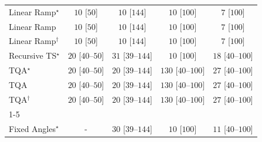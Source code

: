 \begin{tabular}{l|cccc|}
Linear Ramp$^\star$ & {\cellcolor[HTML]{F7FCF5}} \color[HTML]{000000} $10$ [$50$] & {\cellcolor[HTML]{F7FCF5}} \color[HTML]{000000} $10$ [$144$] & {\cellcolor[HTML]{F7FCF5}} \color[HTML]{000000} $10$ [$100$] & {\cellcolor[HTML]{F7FCF5}} \color[HTML]{000000} $7$ [$100$] \\
Linear Ramp & {\cellcolor[HTML]{F7FCF5}} \color[HTML]{000000} $10$ [$50$] & {\cellcolor[HTML]{F7FCF5}} \color[HTML]{000000} $10$ [$144$] & {\cellcolor[HTML]{F7FCF5}} \color[HTML]{000000} $10$ [$100$] & {\cellcolor[HTML]{F7FCF5}} \color[HTML]{000000} $7$ [$100$] \\
Linear Ramp$^\dagger$ & {\cellcolor[HTML]{F7FCF5}} \color[HTML]{000000} $10$ [$50$] & {\cellcolor[HTML]{F7FCF5}} \color[HTML]{000000} $10$ [$144$] & {\cellcolor[HTML]{F7FCF5}} \color[HTML]{000000} $10$ [$100$] & {\cellcolor[HTML]{F7FCF5}} \color[HTML]{000000} $7$ [$100$] \\
Recursive TS$^\star$ & {\cellcolor[HTML]{F5FBF2}} \color[HTML]{000000} $20$ [$40$--$50$] & {\cellcolor[HTML]{F3FAF0}} \color[HTML]{000000} $31$ [$39$--$144$] & {\cellcolor[HTML]{F7FCF5}} \color[HTML]{000000} $10$ [$100$] & {\cellcolor[HTML]{F5FBF3}} \color[HTML]{000000} $18$ [$40$--$100$] \\
TQA$^\star$ & {\cellcolor[HTML]{F5FBF2}} \color[HTML]{000000} $20$ [$40$--$50$] & {\cellcolor[HTML]{F5FBF2}} \color[HTML]{000000} $20$ [$39$--$144$] & {\cellcolor[HTML]{DDF2D8}} \color[HTML]{000000} $130$ [$40$--$100$] & {\cellcolor[HTML]{F4FBF1}} \color[HTML]{000000} $27$ [$40$--$100$] \\
TQA & {\cellcolor[HTML]{F5FBF2}} \color[HTML]{000000} $20$ [$40$--$50$] & {\cellcolor[HTML]{F5FBF2}} \color[HTML]{000000} $20$ [$39$--$144$] & {\cellcolor[HTML]{DDF2D8}} \color[HTML]{000000} $130$ [$40$--$100$] & {\cellcolor[HTML]{F4FBF1}} \color[HTML]{000000} $27$ [$40$--$100$] \\
TQA$^\dagger$ & {\cellcolor[HTML]{F5FBF2}} \color[HTML]{000000} $20$ [$40$--$50$] & {\cellcolor[HTML]{F5FBF2}} \color[HTML]{000000} $20$ [$39$--$144$] & {\cellcolor[HTML]{DDF2D8}} \color[HTML]{000000} $130$ [$40$--$100$] & {\cellcolor[HTML]{F4FBF1}} \color[HTML]{000000} $27$ [$40$--$100$] \\
\cline{1-5}
\multicolumn{5}{c}{\rule{0pt}{8pt}PP} \\
\midrule
Fixed Angles$^\star$ & {\cellcolor[HTML]{000000}} \color[HTML]{F1F1F1} {\cellcolor{white}} \color{black} - & {\cellcolor[HTML]{F3FAF0}} \color[HTML]{000000} $30$ [$39$--$144$] & {\cellcolor[HTML]{F7FCF5}} \color[HTML]{000000} $10$ [$100$] & {\cellcolor[HTML]{F6FCF4}} \color[HTML]{000000} $11$ [$40$--$100$] \\

\end{tabular}
